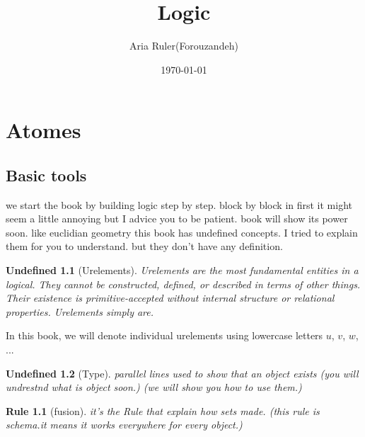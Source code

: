 \documentclass[10pt,a4paper]{book}
\newtheorem{undefined}{Undefined}[section]
\newtheorem{Rule}{Rule}[section]
\begin{document}
\frontmatter
\pagestyle{plain}
\title{\textbf{\Huge Logic}}
\author{\Large Aria Ruler(Forouzandeh)}
\date{\today}
\maketitle

\tableofcontents

\mainmatter
\pagestyle{headings}
\setcounter{chapter}{-1}

\chapter{Atomes}
\section{Basic tools}

we  start the book by building logic step by step. block by block in first it
might seem a little annoying but I advice you to be patient. book will show its
power soon. like euclidian geometry this book has undefined concepts. I tried
to explain them for you to understand. but they don't have any definition.

\begin{undefined}[Urelements]
    Urelements are the most fundamental entities in a logical.
    They cannot be constructed, defined, or described in terms of other things.
    Their existence is primitive-accepted without internal structure or relational properties.
    Urelements simply are.
\end{undefined}

In this book, we will denote individual urelements using lowercase letters $u$,
$v$, $w$,$...$

\begin{undefined}[Type] parallel lines used to show that an object exists
    (you will undrestnd what is object soon.)
    (we will show you how to use them.)
\end{undefined}


\begin{Rule}
    [fusion] it's the Rule that explain how sets made.
    (this rule is schema.it means it works everywhere for every object.)
\end{Rule}
\end{document}
